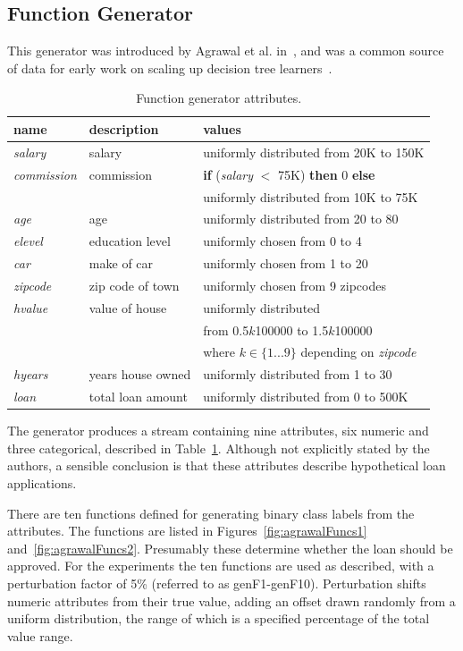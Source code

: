 \subsection{Function Generator}
\label{sec:genFx}

This generator was introduced by Agrawal et al. in~\cite{dbmine}, and was a common source of data for early work on scaling up decision tree learners~\cite{sliq,sprint,rainforest}.

\begin{table}
\caption{Function generator attributes.}
\centering
\begin{tabular}{|l|l|l|}
\hline
name     &    description    &    values    \\
\hline
{\it salary} & salary & uniformly distributed from 20K to 150K \\
{\it commission} & commission & {\bf if} ({\it salary} $<$ 75K) {\bf then} 0 {\bf else} \\
& & uniformly distributed from 10K to 75K \\
{\it age} & age & uniformly distributed from 20 to 80 \\
{\it elevel} & education level & uniformly chosen from 0 to 4 \\
{\it car} & make of car & uniformly chosen from 1 to 20 \\
{\it zipcode} & zip code of town & uniformly chosen from 9 zipcodes \\
{\it hvalue} & value of house & uniformly distributed \\
& & from 0.5$k$100000 to 1.5$k$100000  \\
& & where $k \in \{1...9\}$ depending on {\it zipcode} \\
{\it hyears} & years house owned & uniformly distributed from 1 to 30  \\
{\it loan} & total loan amount & uniformly distributed from 0 to 500K  \\
\hline
\end{tabular}
\label{tab:agrawalAtts}
\end{table}

The generator produces a stream containing nine attributes, six numeric and three categorical, described in Table~\ref{tab:agrawalAtts}. Although not explicitly stated by the authors, a sensible conclusion is that these attributes describe hypothetical loan applications.

There are ten functions defined for generating binary class labels from the attributes. The functions are listed in Figures~\ref{fig:agrawalFuncs1} and~\ref{fig:agrawalFuncs2}. Presumably these determine whether the loan should be approved. For the experiments the ten functions are used as described, with a perturbation factor of 5\% (referred to as {\sc genF1}-{\sc genF10}). 
Perturbation shifts numeric attributes from their true value, adding an offset drawn randomly from a uniform distribution, the range of which is a specified percentage of the total value range.

